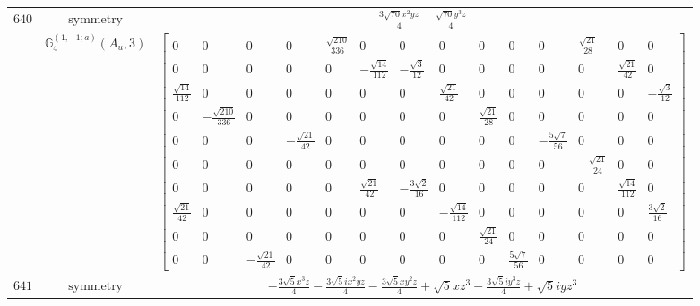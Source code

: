 \documentclass[fleqn,8pt,landscape]{jsarticle}
\begin{document}
\begin{longtable}{ccc}
$ 640 $ & $ \text{symmetry} $ & $ \frac{3 \sqrt{70} x^{2} y z}{4} - \frac{\sqrt{70} y^{3} z}{4} $ \\
$  $ & $ \mathbb{G}_{4}^{(1,-1;a)}(A_{u},3) $ & $ \begin{bmatrix} 0 & 0 & 0 & 0 & \frac{\sqrt{210}}{336} & 0 & 0 & 0 & 0 & 0 & 0 & \frac{\sqrt{21}}{28} & 0 & 0 \\ 0 & 0 & 0 & 0 & 0 & - \frac{\sqrt{14}}{112} & - \frac{\sqrt{3}}{12} & 0 & 0 & 0 & 0 & 0 & \frac{\sqrt{21}}{42} & 0 \\ \frac{\sqrt{14}}{112} & 0 & 0 & 0 & 0 & 0 & 0 & \frac{\sqrt{21}}{42} & 0 & 0 & 0 & 0 & 0 & - \frac{\sqrt{3}}{12} \\ 0 & - \frac{\sqrt{210}}{336} & 0 & 0 & 0 & 0 & 0 & 0 & \frac{\sqrt{21}}{28} & 0 & 0 & 0 & 0 & 0 \\ 0 & 0 & 0 & - \frac{\sqrt{21}}{42} & 0 & 0 & 0 & 0 & 0 & 0 & - \frac{5 \sqrt{7}}{56} & 0 & 0 & 0 \\ 0 & 0 & 0 & 0 & 0 & 0 & 0 & 0 & 0 & 0 & 0 & - \frac{\sqrt{21}}{24} & 0 & 0 \\ 0 & 0 & 0 & 0 & 0 & \frac{\sqrt{21}}{42} & - \frac{3 \sqrt{2}}{16} & 0 & 0 & 0 & 0 & 0 & \frac{\sqrt{14}}{112} & 0 \\ \frac{\sqrt{21}}{42} & 0 & 0 & 0 & 0 & 0 & 0 & - \frac{\sqrt{14}}{112} & 0 & 0 & 0 & 0 & 0 & \frac{3 \sqrt{2}}{16} \\ 0 & 0 & 0 & 0 & 0 & 0 & 0 & 0 & \frac{\sqrt{21}}{24} & 0 & 0 & 0 & 0 & 0 \\ 0 & 0 & - \frac{\sqrt{21}}{42} & 0 & 0 & 0 & 0 & 0 & 0 & \frac{5 \sqrt{7}}{56} & 0 & 0 & 0 & 0 \end{bmatrix} $ \\ \hline
$ 641 $ & $ \text{symmetry} $ & $ - \frac{3 \sqrt{5} x^{3} z}{4} - \frac{3 \sqrt{5} i x^{2} y z}{4} - \frac{3 \sqrt{5} x y^{2} z}{4} + \sqrt{5} x z^{3} - \frac{3 \sqrt{5} i y^{3} z}{4} + \sqrt{5} i y z^{3} $ \\

\end{longtable}
\end{document}
